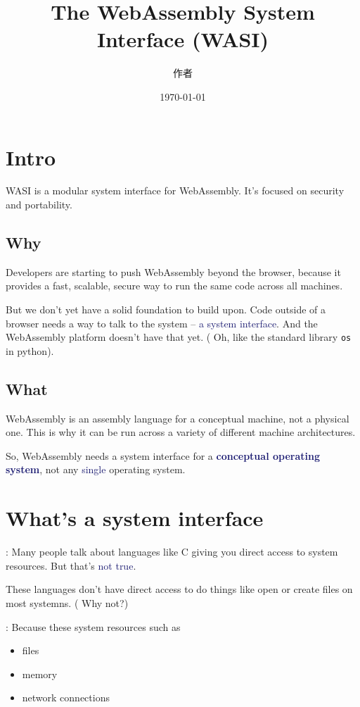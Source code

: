 \documentclass[dvipsnames]{article}
\title{The WebAssembly System Interface (WASI)}
\date{\today}
\author{作者}
\newcommand{\mycola}{MidnightBlue}
\newcommand{\cola}[1]{\textcolor{\mycola}{#1}}
\newcommand{\Cola}[1]{\textcolor{\mycola}{\textbf{#1}}}
\begin{document}
\maketitle{}

\section{Intro}
WASI is a modular system interface for WebAssembly. It's focused on security and portability.

\subsection{Why}
Developers are starting to push WebAssembly beyond the browser, because it
provides a fast, scalable, secure way to run the same code across all machines.

But we don't yet have a solid foundation to build upon. Code outside of a
browser needs a way to talk to the system -- \cola{a system interface}. And the
WebAssembly platform doesn't have that yet. ( Oh, like the
standard library \texttt{os} in python).

\subsection{What}

WebAssembly is an assembly language for a conceptual machine, not a physical
one. This is why it can be run across a variety of different machine
architectures.

So, WebAssembly needs a system interface for a \Cola{conceptual operating
  system}, not any \cola{single} operating system.

\section{What's a system interface}

 : Many people talk about languages like C giving you direct access to system
resources. But that's \cola{not true}.

These languages don't have direct access to do things like open or create files
on most systemns. ( Why not?)

 : Because these system resources such as

\begin{itemize}
\item files
\item memory
\item network connections
\end{itemize}
\end{document}
